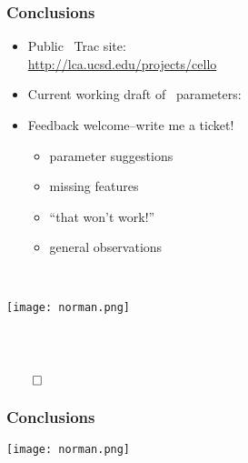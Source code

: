 \begin{frame}[fragile] 
   \frametitle{Conclusions}




\begin{itemize}
\item Public \cello\ Trac site: \\ \textcolor{blue}{\url{http://lca.ucsd.edu/projects/cello}}
\item Current working draft of \enzop\ parameters:
{\footnotesize{}}
\end{itemize}
\begin{minipage}{2.6in}
\begin{itemize}
\item Feedback welcome--write me a ticket!
\begin{itemize}
\item parameter suggestions
\item missing features
\item ``that won't work!''
\item general observations
\end{itemize}
\end{itemize}
\end{minipage} \
\begin{minipage}{1.2in}
   \centerline{\texttt{[image: norman.png]}}
\end{minipage}
\ \\
\ \\
\centerline{$\qed$}
\end{frame}

\begin{frame}[fragile] 
   \frametitle{Conclusions}
\centerline{\texttt{[image: norman.png]}}
\end{frame}
